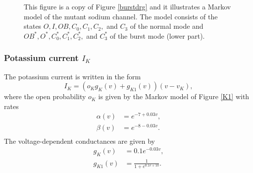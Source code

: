 \begin{figure}[ptb]
\begin{center}
\end{center}
\caption{This figure is a copy of Figure \ref{burstdrg} and it illustrates a Markov model of the mutant sodium channel.
 The model consists of the states $O,I,OB,C_{0}
,C_{1},C_{2},$ and $C_{3}$ of the normal mode and $OB^*,O^{*},C^{*}_{0},C^{*}
_{1},C^{*}_{2},$ and $C^{*}_{3}$ of the burst mode (lower part). }
\label{wtreac3300}
\end{figure}

\subsubsection{Potassium current $I_{K}$}

The potassium current is written in the form
\begin{equation}
I_{K}= (o_{K} g_{K}(v) + g_{K1}(v)) (v-v_{K}),   \label{J_K}
\end{equation}
where the open probability $o_{K}$ is given by the Markov model of Figure  \ref{K1} with rates
\begin{align*}
\alpha(v) &  = e^{-7+0.03v},\\
\beta(v) &  = e^{-8-0.03v}. \\
\end{align*}
The voltage-dependent conductances are given by
\begin{align*}
g_K(v) &=  0.1 e^{-0.03v}, \\
g_{K1}(v) &= \frac{1}{1+e^{0.1 v+10}}. \\
\end{align*}


